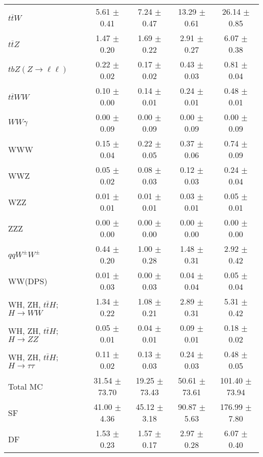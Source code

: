 \begin{tabular}{l|cccc}
                   $t\overline{t}W$ &  5.61 $\pm$  0.41 &  7.24 $\pm$  0.47 & 13.29 $\pm$  0.61 & 26.14 $\pm$  0.85 \\
                   $t\overline{t}Z$ &  1.47 $\pm$  0.20 &  1.69 $\pm$  0.22 &  2.91 $\pm$  0.27 &  6.07 $\pm$  0.38 \\
    $tbZ (Z \rightarrow \ell \ell)$ &  0.22 $\pm$  0.02 &  0.17 $\pm$  0.02 &  0.43 $\pm$  0.03 &  0.81 $\pm$  0.04 \\
                  $t\overline{t}WW$ &  0.10 $\pm$  0.00 &  0.14 $\pm$  0.01 &  0.24 $\pm$  0.01 &  0.48 $\pm$  0.01 \\
                         $WW\gamma$ &  0.00 $\pm$  0.09 &  0.00 $\pm$  0.09 &  0.00 $\pm$  0.09 &  0.00 $\pm$  0.09 \\
                                WWW &  0.15 $\pm$  0.04 &  0.22 $\pm$  0.05 &  0.37 $\pm$  0.06 &  0.74 $\pm$  0.09 \\
                                WWZ &  0.05 $\pm$  0.02 &  0.08 $\pm$  0.03 &  0.12 $\pm$  0.03 &  0.24 $\pm$  0.04 \\
                                WZZ &  0.01 $\pm$  0.01 &  0.01 $\pm$  0.01 &  0.03 $\pm$  0.01 &  0.05 $\pm$  0.01 \\
                                ZZZ &  0.00 $\pm$  0.00 &  0.00 $\pm$  0.00 &  0.00 $\pm$  0.00 &  0.00 $\pm$  0.00 \\
                 $qqW^{\pm}W^{\pm}$ &  0.44 $\pm$  0.20 &  1.00 $\pm$  0.28 &  1.48 $\pm$  0.31 &  2.92 $\pm$  0.42 \\
                            WW(DPS) &  0.01 $\pm$  0.03 &  0.00 $\pm$  0.03 &  0.04 $\pm$  0.04 &  0.05 $\pm$  0.04 \\
WH, ZH, $t\bar{t}H$; $H \rightarrow WW$ &  1.34 $\pm$  0.22 &  1.08 $\pm$  0.21 &  2.89 $\pm$  0.31 &  5.31 $\pm$  0.42 \\
WH, ZH, $t\bar{t}H$; $H \rightarrow ZZ$ &  0.05 $\pm$  0.01 &  0.04 $\pm$  0.01 &  0.09 $\pm$  0.01 &  0.18 $\pm$  0.02 \\
WH, ZH, $t\bar{t}H$; $H \rightarrow \tau\tau$ &  0.11 $\pm$  0.02 &  0.13 $\pm$  0.03 &  0.24 $\pm$  0.03 &  0.48 $\pm$  0.05 \\
\hline\hline
                           Total MC & 31.54 $\pm$ 73.70 & 19.25 $\pm$ 73.43 & 50.61 $\pm$ 73.61 & 101.40 $\pm$ 73.94 \\
\hline
                                 SF & 41.00 $\pm$  4.36 & 45.12 $\pm$  3.18 & 90.87 $\pm$  5.63 & 176.99 $\pm$  7.80 \\
                                 DF &  1.53 $\pm$  0.23 &  1.57 $\pm$  0.17 &  2.97 $\pm$  0.28 &  6.07 $\pm$  0.40 \\

\end{tabular}
